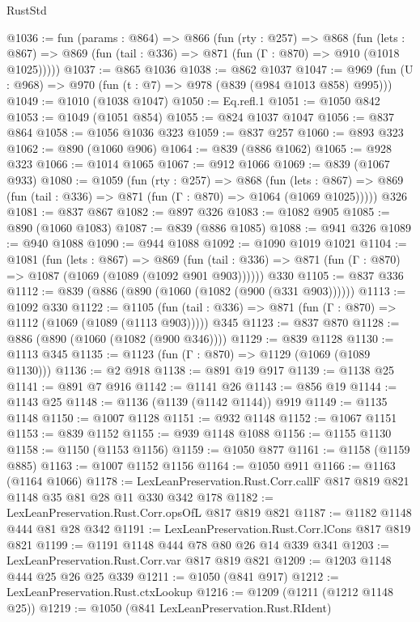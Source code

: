 \begin{lexlean}{RustStd}
\begin{coremodule}
@1036 := fun (params : @864) =>
  @866
    (fun (rty : @257) =>
    @868
      (fun (lets : @867) =>
      @869 (fun (tail : @336) => @871 (fun (Γ : @870) => @910 (@1018 @1025)))))
@1037 := @865 @1036
@1038 := @862 @1037
@1047 := @969 (fun (U : @968) => @970 (fun (t : @7) => @978 (@839 (@984 @1013 @858) @995)))
@1049 := @1010 (@1038 @1047)
@1050 := Eq.refl.{1}
@1051 := @1050 @842
@1053 := @1049 (@1051 @854)
@1055 := @824 @1037 @1047
@1056 := @837 @864
@1058 := @1056 @1036 @323
@1059 := @837 @257
@1060 := @893 @323
@1062 := @890 (@1060 @906)
@1064 := @839 (@886 @1062)
@1065 := @928 @323
@1066 := @1014 @1065
@1067 := @912 @1066
@1069 := @839 (@1067 @933)
@1080 := @1059
    (fun (rty : @257) =>
    @868
      (fun (lets : @867) =>
      @869 (fun (tail : @336) => @871 (fun (Γ : @870) => @1064 (@1069 @1025)))))
    @326
@1081 := @837 @867
@1082 := @897 @326
@1083 := @1082 @905
@1085 := @890 (@1060 @1083)
@1087 := @839 (@886 @1085)
@1088 := @941 @326
@1089 := @940 @1088
@1090 := @944 @1088
@1092 := @1090 @1019 @1021
@1104 := @1081
    (fun (lets : @867) =>
    @869 (fun (tail : @336) => @871 (fun (Γ : @870) => @1087 (@1069 (@1089 (@1092 @901 @903))))))
    @330
@1105 := @837 @336
@1112 := @839 (@886 (@890 (@1060 (@1082 (@900 (@331 @903))))))
@1113 := @1092 @330
@1122 := @1105
    (fun (tail : @336) => @871 (fun (Γ : @870) => @1112 (@1069 (@1089 (@1113 @903)))))
    @345
@1123 := @837 @870
@1128 := @886 (@890 (@1060 (@1082 (@900 @346))))
@1129 := @839 @1128
@1130 := @1113 @345
@1135 := @1123 (fun (Γ : @870) => @1129 (@1069 (@1089 @1130)))
@1136 := @2 @918
@1138 := @891 @19 @917
@1139 := @1138 @25
@1141 := @891 @7 @916
@1142 := @1141 @26
@1143 := @856 @19
@1144 := @1143 @25
@1148 := @1136 (@1139 (@1142 @1144)) @919
@1149 := @1135 @1148
@1150 := @1007 @1128
@1151 := @932 @1148
@1152 := @1067 @1151
@1153 := @839 @1152
@1155 := @939 @1148 @1088
@1156 := @1155 @1130
@1158 := @1150 (@1153 @1156)
@1159 := @1050 @877
@1161 := @1158 (@1159 @885)
@1163 := @1007 @1152 @1156
@1164 := @1050 @911
@1166 := @1163 (@1164 @1066)
@1178 := LexLeanPreservation.Rust.Corr.callF @817 @819 @821 @1148 @35 @81 @28 @11 @330 @342 @178
@1182 := LexLeanPreservation.Rust.Corr.opsOfL @817 @819 @821
@1187 := @1182 @1148 @444 @81 @28 @342
@1191 := LexLeanPreservation.Rust.Corr.lCons @817 @819 @821
@1199 := @1191 @1148 @444 @78 @80 @26 @14 @339 @341
@1203 := LexLeanPreservation.Rust.Corr.var @817 @819 @821
@1209 := @1203 @1148 @444 @25 @26 @25 @339
@1211 := @1050 (@841 @917)
@1212 := LexLeanPreservation.Rust.ctxLookup
@1216 := @1209 (@1211 (@1212 @1148 @25))
@1219 := @1050 (@841 LexLeanPreservation.Rust.RIdent)

\end{coremodule}
\end{lexlean}
